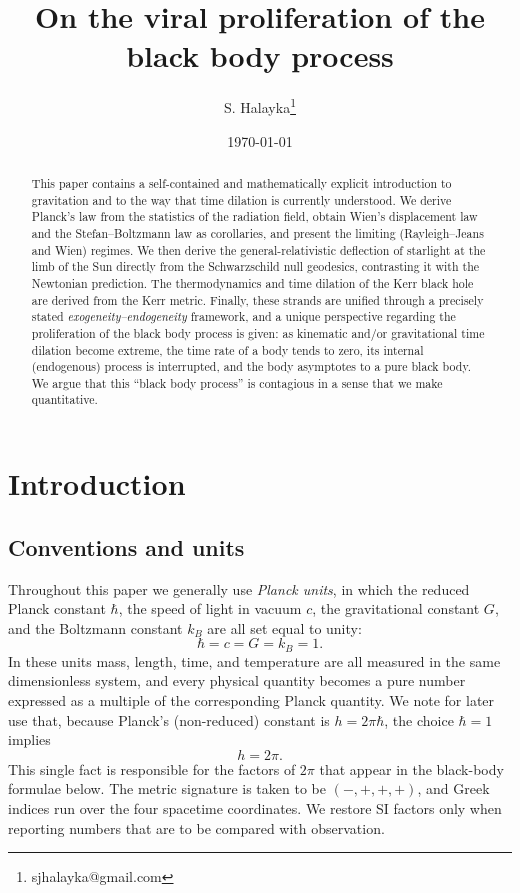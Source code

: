 \documentclass[10pt]{article}
\title{On the viral proliferation of the black body process}
\author{S. Halayka\footnote{sjhalayka@gmail.com}}
\date{\today\;\currenttime}
\theoremstyle{definition}
\theoremstyle{remark}
\begin{document}
\linenumbers


 
\maketitle

\begin{abstract}
This paper contains a self-contained and mathematically explicit introduction to gravitation and to the way that time dilation is currently understood. We derive Planck's law from the statistics of the radiation field, obtain Wien's displacement law and the Stefan--Boltzmann law as corollaries, and present the limiting (Rayleigh--Jeans and Wien) regimes. We then derive the general-relativistic deflection of starlight at the limb of the Sun directly from the Schwarzschild null geodesics, contrasting it with the Newtonian prediction. The thermodynamics and time dilation of the Kerr black hole are derived from the Kerr metric. Finally, these strands are unified through a precisely stated \emph{exogeneity--endogeneity} framework, and a unique perspective regarding the proliferation of the black body process is given: as kinematic and/or gravitational time dilation become extreme, the time rate of a body tends to zero, its internal (endogenous) process is interrupted, and the body asymptotes to a pure black body. We argue that this ``black body process'' is contagious in a sense that we make quantitative.
\end{abstract}

\section{Introduction}

\subsection{Conventions and units}

Throughout this paper we generally use \emph{Planck units}, in which the reduced Planck constant $\hbar$, the speed of light in vacuum $c$, the gravitational constant $G$, and the Boltzmann constant $k_B$ are all set equal to unity:
\begin{equation}
\hbar = c = G = k_B = 1.
\end{equation}
In these units mass, length, time, and temperature are all measured in the same dimensionless system, and every physical quantity becomes a pure number expressed as a multiple of the corresponding Planck quantity. We note for later use that, because Planck's (non-reduced) constant is $h = 2\pi\hbar$, the choice $\hbar = 1$ implies
\begin{equation}
h = 2\pi .
\end{equation}
This single fact is responsible for the factors of $2\pi$ that appear in the black-body formulae below. The metric signature is taken to be $(-,+,+,+)$, and Greek indices run over the four spacetime coordinates. We restore SI factors only when reporting numbers that are to be compared with observation.
\end{document}
